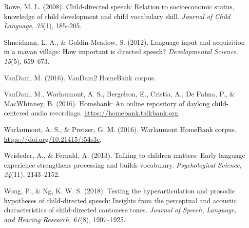 \documentclass[10pt, letterpaper]{article}
\newenvironment{CSLReferences}%
  {}%
  {\par}
\begin{document}
\begin{CSLReferences}{1}{0}
\leavevmode\hypertarget{ref-rowe2008child}{}%
Rowe, M. L. (2008). Child-directed speech: Relation to socioeconomic
status, knowledge of child development and child vocabulary skill.
\emph{Journal of Child Language}, \emph{35}(1), 185--205.

\leavevmode\hypertarget{ref-shneidman2012language}{}%
Shneidman, L. A., \& Goldin-Meadow, S. (2012). Language input and
acquisition in a mayan village: How important is directed speech?
\emph{Developmental Science}, \emph{15}(5), 659--673.

\leavevmode\hypertarget{ref-vandamcorpus}{}%
VanDam, M. (2016). VanDam2 HomeBank corpus.

\leavevmode\hypertarget{ref-homebank}{}%
VanDam, M., Warlaumont, A. S., Bergelson, E., Cristia, A., De Palma, P.,
\& MacWhinney, B. (2016). Homebank: An online repository of daylong
child-centered audio recordings. \url{https://homebank.talkbank.org}.

\leavevmode\hypertarget{ref-warlaumontcorpus}{}%
Warlaumont, A. S., \& Pretzer, G. M. (2016). Warlaumont HomeBank corpus.
\url{https://doi.org/10.21415/t54s3c}.

\leavevmode\hypertarget{ref-weisleder2013talking}{}%
Weisleder, A., \& Fernald, A. (2013). Talking to children matters: Early
language experience strengthens processing and builds vocabulary.
\emph{Psychological Science}, \emph{24}(11), 2143--2152.

\leavevmode\hypertarget{ref-wong2018testing}{}%
Wong, P., \& Ng, K. W. S. (2018). Testing the hyperarticulation and
prosodic hypotheses of child-directed speech: Insights from the
perceptual and acoustic characteristics of child-directed cantonese
tones. \emph{Journal of Speech, Language, and Hearing Research},
\emph{61}(8), 1907--1925.

\end{CSLReferences}


\end{document}
